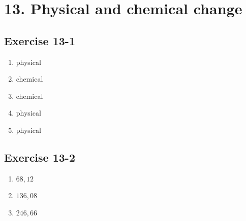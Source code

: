 \section{13. Physical and chemical change}
\subsection{Exercise 13-1}
\begin{multicols}{5}
 \begin{enumerate}[noitemsep, label=\textbf{(\arabic*)} ]
  \item physical
\item chemical
\item chemical
\item physical
\item physical
 \end{enumerate}
\end{multicols}

\subsection{Exercise 13-2}
\begin{multicols}{3}
 \begin{enumerate}[noitemsep, label=\textbf{(\arabic*)} ]
  \item $68,12$
\item $136,08$
\item $246,66$
 \end{enumerate}
\end{multicols}


